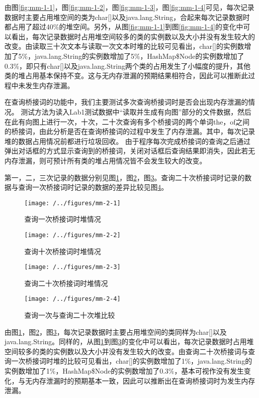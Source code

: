 由图\ref{fig:mm-1-1}，图\ref{fig:mm-1-2}，图\ref{fig:mm-1-3}，图\ref{fig:mm-1-4}可见，每次记录数据时主要占用堆空间的类为char[]以及java.lang.String，合起来每次记录数据时都占用了超过40\%的堆空间。另外，从图\ref{fig:mm-1-1}到图\ref{fig:mm-1-4}的变化中可以看出，每次记录数据时占用堆空间较多的类的实例数以及大小并没有发生较大的改变。由读取三十次文本与读取一次文本时堆的比较可见看出，char[]的实例数增加了5\%，java.lang.String的实例数增加了5\%，HashMap\$Node的实例数增加了0.3\%，即只有char[]以及java.lang.String两个类的占用发生了小幅度的提升，其他类的堆占用基本保持不变。这与无内存泄漏的预期结果相符合，因此可以推断此过程中未发生内存泄漏。

在查询桥接词的功能中，我们主要测试多次查询桥接词时是否会出现内存泄漏的情况。
测试方法为读入Lab1测试数据中“读取并生成有向图”部分的文件数据，然后在此有向图上进行一次，十次，二十次查询有多个桥接词的两个单词the，of之间的桥接词，由此分析是否在查询桥接词的过程中发生了内存泄漏。其中，每次记录堆的数据占用情况前都进行垃圾回收。
由于程序每次完成桥接词的查询之后通过弹出对话框的方式显示查询到的桥接词，关闭对话框后查询结果即消失，因此若无内存泄漏，则可预计所有类的堆占用情况皆不会发生较大的改变。

第一，二，三次记录的数据分别见图\ref{fig:mm-2-1}，图\ref{fig:mm-2-2}，图\ref{fig:mm-2-3}。查询二十次桥接词时记录的数据与查询一次桥接词时记录的数据的差异比较见图\ref{fig:mm-2-4}。

\begin{figure}
\centering
\texttt{[image: /../figures/mm-2-1]}
\caption{查询一次桥接词时堆情况}
\label{fig:mm-2-1}
\end{figure}

\begin{figure}
\centering
\texttt{[image: /../figures/mm-2-2]}
\caption{查询十次桥接词时堆情况}
\label{fig:mm-2-2}
\end{figure}

\begin{figure}
\centering
\texttt{[image: /../figures/mm-2-3]}
\caption{查询二十次桥接词时堆情况}
\label{fig:mm-2-3}
\end{figure}

\begin{figure}
\centering
\texttt{[image: /../figures/mm-2-4]}
\caption{查询一次与查询二十次堆比较}
\label{fig:mm-2-4}
\end{figure}

由图\ref{fig:mm-2-1}，图\ref{fig:mm-2-2}，图\ref{fig:mm-2-3}，每次记录数据时主要占用堆空间的类同样为char[]以及java.lang.String。同样的，从图\ref{fig:mm-2-1}到图\ref{fig:mm-2-3}的变化中可以看出，每次记录数据时占用堆空间较多的类的实例数以及大小并没有发生较大的改变。由查询二十次桥接词与查询一次桥接词时堆的比较可见看出，char[]的实例数增加了1\%，java.lang.String的实例数增加了1\%，HashMap\$Node的实例数增加了0.3\%，基本可视作没有发生变化，与无内存泄漏时的预期基本一致，因此可以推断出在查询桥接词时为发生内存泄漏。

